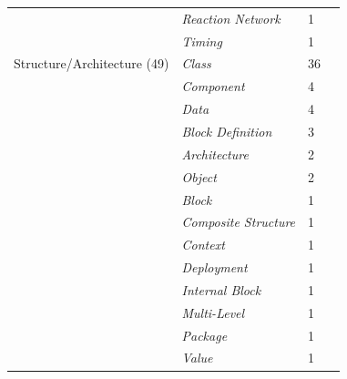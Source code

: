 \begin{tabular} {p{}  p{} p{} p{}}
 & \emph{Reaction Network} & 1 & \cite{ \papertwohundredfortyfourth }\\ 
 & \emph{Timing} & 1 & \cite{ \paperfortythird }\\ 
\midrule  
Structure/Architecture (49) & \emph{Class} & 36 & \cite{ \paperfirst,\paperseventh,\paperninth,\papersixteenth,\papertwentyeighth,\paperthirtyeighth,\paperfortysecond,\paperfortythird,\paperfortyseventh,\paperfiftieth,\paperfiftysecond,\paperfiftyninth,\paperseventyseventh,\paperseventyeighth,\paperseventyninth,\papereightythird,\paperninetysecond,\paperninetythird,\paperonehundredsixth,\paperonehundredninth,\paperonehundredtenth,\paperonehundredthirtieth,\paperonehundredthirtythird,\paperonehundredsixtythird,\paperonehundredseventysecond,\paperonehundredninetieth,\paperonehundredninetysixth,\papertwohundredth,\papertwohundredninth,\papertwohundredtwelfth,\papertwohundredfourteenth,\papertwohundredsixteenth,\papertwohundredtwentythird,\papertwohundredtwentyfifth,\papertwohundredfortieth,\papertwohundredfiftyfirst }\\ 
 & \emph{Component} & 4 & \cite{ \papertwelfth,\paperfortythird,\paperfortysixth,\paperonehundredfirst }\\ 
 & \emph{Data} & 4 & \cite{ \paperonehundredseventeenth,\paperonehundredsixtythird,\papertwohundredfifth,\papertwohundredeighteenth }\\ 
 & \emph{Block Definition} & 3 & \cite{ \paperseventieth,\paperonehundredfourth,\paperonehundredseventh }\\ 
 & \emph{Architecture} & 2 & \cite{ \paperthirteenth,\papertwohundredfortieth }\\ 
 & \emph{Object} & 2 & \cite{ \paperninth,\paperfortythird }\\ 
 & \emph{Block} & 1 & \cite{ \paperseventysixth }\\ 
 & \emph{Composite Structure} & 1 & \cite{ \paperfortythird }\\ 
 & \emph{Context} & 1 & \cite{ \papertwohundredfortieth }\\ 
 & \emph{Deployment} & 1 & \cite{ \paperfortythird }\\ 
 & \emph{Internal Block} & 1 & \cite{ \paperonehundredseventh }\\ 
 & \emph{Multi-Level} & 1 & \cite{ \papertwohundredtwentysixth }\\ 
 & \emph{Package} & 1 & \cite{ \paperfortythird }\\ 
 & \emph{Value} & 1 & \cite{ \papertwohundredfortysixth }\\ 
\midrule  

\end{tabular}
